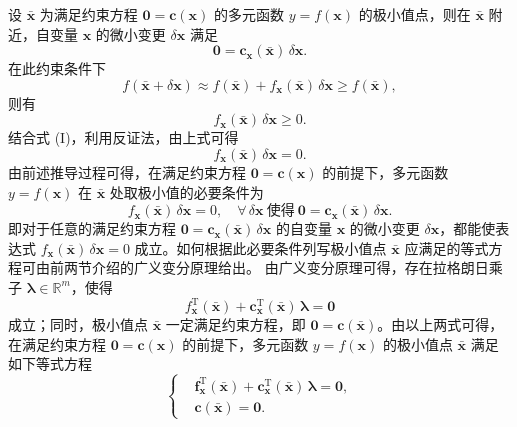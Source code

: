 设 $\bar{\boldsymbol{x}}$ 为满足约束方程 $\boldsymbol{0}=\boldsymbol{c}(\boldsymbol{x})$ 的多元函数 $y=f(\boldsymbol{x})$ 的极小值点，则在 $\bar{\boldsymbol{x}}$ 附近，自变量 $\boldsymbol{x}$ 的微小变更 $\delta\boldsymbol{x}$ 满足
\begin{equation*}
\tag{I}
\boldsymbol{0}=\boldsymbol{c}_{\boldsymbol{x}}(\bar{\boldsymbol{x}})\,\delta\boldsymbol{x}.
\end{equation*}
在此约束条件下
\[
f(\bar{\boldsymbol{x}}+\delta\boldsymbol{x})\approx f(\bar{\boldsymbol{x}})+f_{\boldsymbol{x}}(\bar{\boldsymbol{x}})\,\delta\boldsymbol{x}\geq f(\bar{\boldsymbol{x}}),
\]
则有
\[
f_{\boldsymbol{x}}(\bar{\boldsymbol{x}})\,\delta\boldsymbol{x}\geq0.
\]
结合式 (I)，利用反证法，由上式可得
\begin{equation*}
\tag{II}
f_{\boldsymbol{x}}(\bar{\boldsymbol{x}})\,\delta\boldsymbol{x}=0.
\end{equation*}
由前述推导过程可得，在满足约束方程 $\boldsymbol{0}=\boldsymbol{c}(\boldsymbol{x})$ 的前提下，多元函数 $y=f(\boldsymbol{x})$ 在 $\bar{\boldsymbol{x}}$ 处取极小值的必要条件为
\[
f_{\boldsymbol{x}}(\bar{\boldsymbol{x}})\,\delta\boldsymbol{x}=0,\quad\forall\,\delta\boldsymbol{x}\ \text{使得}\ \boldsymbol{0}=\boldsymbol{c}_{\boldsymbol{x}}(\bar{\boldsymbol{x}})\,\delta\boldsymbol{x}.
\]
即对于任意的满足约束方程 $\boldsymbol{0}=\boldsymbol{c}_{\boldsymbol{x}}(\bar{\boldsymbol{x}})\,\delta\boldsymbol{x}$ 的自变量 $\boldsymbol{x}$ 的微小变更 $\delta\boldsymbol{x}$，都能使表达式 $f_{\boldsymbol{x}}(\bar{\boldsymbol{x}})\,\delta\boldsymbol{x}=0$ 成立。如何根据此必要条件列写极小值点 $\bar{\boldsymbol{x}}$ 应满足的等式方程可由前两节介绍的广义变分原理给出。
由广义变分原理可得，存在拉格朗日乘子 $\boldsymbol{\lambda}\in\mathbb{R}^m$，使得
\[
f_{\boldsymbol{x}}^{\mathrm{T}}(\bar{\boldsymbol{x}})+\boldsymbol{c}_{\boldsymbol{x}}^{\mathrm{T}}(\bar{\boldsymbol{x}})\,\boldsymbol{\lambda}=\boldsymbol{0}
\]
成立；同时，极小值点 $\bar{\boldsymbol{x}}$ 一定满足约束方程，即 $\boldsymbol{0}=\boldsymbol{c}(\bar{\boldsymbol{x}})$。由以上两式可得，在满足约束方程 $\boldsymbol{0}=\boldsymbol{c}(\boldsymbol{x})$ 的前提下，多元函数 $y=f(\boldsymbol{x})$ 的极小值点 $\bar{\boldsymbol{x}}$ 满足如下等式方程
\[
\left\{
\begin{aligned}
&\boldsymbol{f}_{\boldsymbol{x}}^{\mathrm{T}}(\bar{\boldsymbol{x}})+\boldsymbol{c}_{\boldsymbol{x}}^{\mathrm{T}}(\bar{\boldsymbol{x}})\,\boldsymbol{\lambda}=\boldsymbol{0},\\
&\boldsymbol{c}(\bar{\boldsymbol{x}})=\boldsymbol{0}.
\end{aligned}
\right.
\]
